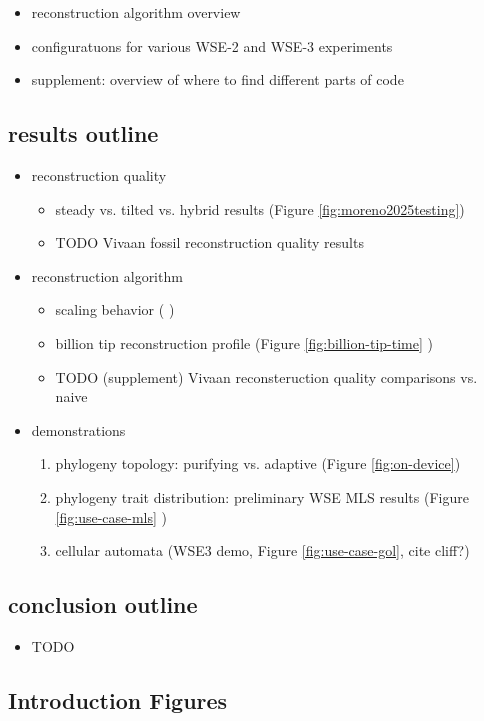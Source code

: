 \begin{itemize}
\item reconstruction algorithm overview
\item configuratuons for various WSE-2 and WSE-3 experiments
\item supplement: overview of where to find different parts of code
\end{itemize}

\subsection{results outline}

\begin{itemize}
\item reconstruction quality
   \begin{itemize}
   \item steady vs. tilted vs. hybrid results (Figure \ref{fig:moreno2025testing})
   \item TODO Vivaan fossil reconstruction quality results
   \end{itemize}
\item reconstruction algorithm
   \begin{itemize}
  \item scaling behavior ( \citep{singhvi2025scalable})
   \item billion tip reconstruction profile (Figure \ref{fig:billion-tip-time} \citep{singhvi2025scalable})
   \item TODO (supplement) Vivaan reconsteruction quality comparisons vs. naive
   \end{itemize}
\item demonstrations
  \begin{enumerate}
  \item phylogeny topology: purifying vs. adaptive (Figure \ref{fig:on-device}) \citep{moreno2024trackable}
  \item phylogeny trait distribution: preliminary WSE MLS results (Figure \ref{fig:use-case-mls} \citep{moreno2025extending})
  \item cellular automata (WSE3 demo, Figure \ref{fig:use-case-gol}, cite cliff?)
  \end{enumerate}
\end{itemize}

\subsection{conclusion outline}

\begin{itemize}
\item TODO
\end{itemize}

\subsection{Introduction Figures}

\FloatBarrier








